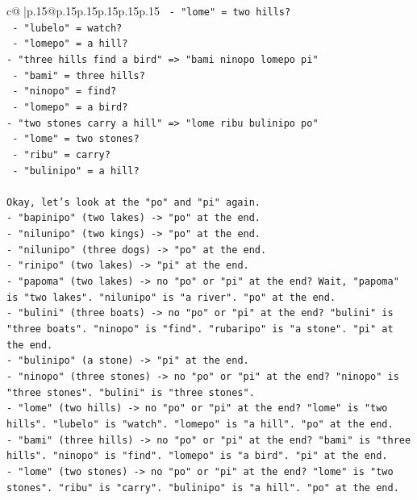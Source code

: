 \documentclass{article}
\begin{document}
{\begin{supertabular}{c@{$\;$}|p{.15\linewidth}@{}p{.15\linewidth}p{.15\linewidth}p{.15\linewidth}p{.15\linewidth}p{.15\linewidth}}
{{{\texttt{  {-} "lome" = two hills?} \\
\texttt{  {-} "lubelo" = watch?} \\
\texttt{  {-} "lomepo" = a hill?} \\
\texttt{{-} "three hills find a bird" => "bami ninopo lomepo pi"} \\
\texttt{  {-} "bami" = three hills?} \\
\texttt{  {-} "ninopo" = find?} \\
\texttt{  {-} "lomepo" = a bird?} \\
\texttt{{-} "two stones carry a hill" => "lome ribu bulinipo po"} \\
\texttt{  {-} "lome" = two stones?} \\
\texttt{  {-} "ribu" = carry?} \\
\texttt{  {-} "bulinipo" = a hill?} \\
\\ 
\texttt{Okay, let's look at the "po" and "pi" again.} \\
\texttt{{-} "bapinipo" (two lakes) {-}> "po" at the end.} \\
\texttt{{-} "nilunipo" (two kings) {-}> "po" at the end.} \\
\texttt{{-} "nilunipo" (three dogs) {-}> "po" at the end.} \\
\texttt{{-} "rinipo" (two lakes) {-}> "pi" at the end.} \\
\texttt{{-} "papoma" (two lakes) {-}> no "po" or "pi" at the end? Wait, "papoma" is "two lakes". "nilunipo" is "a river". "po" at the end.} \\
\texttt{{-} "bulini" (three boats) {-}> no "po" or "pi" at the end? "bulini" is "three boats". "ninopo" is "find". "rubaripo" is "a stone". "pi" at the end.} \\
\texttt{{-} "bulinipo" (a stone) {-}> "pi" at the end.} \\
\texttt{{-} "ninopo" (three stones) {-}> no "po" or "pi" at the end? "ninopo" is "three stones". "bulini" is "three stones".} \\
\texttt{{-} "lome" (two hills) {-}> no "po" or "pi" at the end? "lome" is "two hills". "lubelo" is "watch". "lomepo" is "a hill". "po" at the end.} \\
\texttt{{-} "bami" (three hills) {-}> no "po" or "pi" at the end? "bami" is "three hills". "ninopo" is "find". "lomepo" is "a bird". "pi" at the end.} \\
\texttt{{-} "lome" (two stones) {-}> no "po" or "pi" at the end? "lome" is "two stones". "ribu" is "carry". "bulinipo" is "a hill". "po" at the end.} \\
}}}
\end{supertabular}}
\end{document}
